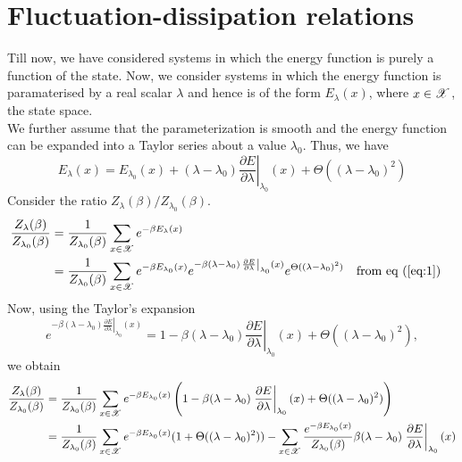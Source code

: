 \documentclass[letterpaper,english,10pt]{article}
\begin{document}
\section{Fluctuation-dissipation relations}
Till now, we have considered systems in which the energy function is purely a function of the state. Now, we consider systems in which the energy function is paramaterised by a real scalar $\lambda$ and hence is of the form $E_\lambda(x)$, where $x \in \mathscr{X}$, the state space.\\
We further assume that the parameterization is smooth and the energy function can be expanded into a Taylor series about a value $\lambda_0$. Thus, we have
\begin{equation}
E_\lambda(x) = E_{\lambda_0}(x) + (\lambda - \lambda_0)\left. \frac{\partial E}{\partial \lambda} \right|_{\lambda_0}(x) + \Theta((\lambda - \lambda_0)^2) \label{eq:1}
\end{equation}
Consider the ratio $Z_\lambda(\beta) / Z_{\lambda_0}(\beta)$.
\begin{align}
\frac{Z_\lambda(\beta)}{Z_{\lambda_0}(\beta)} &= \frac{1}{Z_{\lambda_0}(\beta)} \sum_{x \in \mathscr{X}} e^{-\beta E_{\lambda}(x)} \nonumber \\
	&= \frac{1}{Z_{\lambda_0}(\beta)} \sum_{x \in \mathscr{X}} e^{-\beta E_{\lambda_0}(x)} e^{-\beta (\lambda - \lambda_0)\left. \frac{\partial E}{\partial \lambda} \right|_{\lambda_0}(x)} e^{\Theta((\lambda - \lambda_0)^2)} && \text{from eq (\ref{eq:1})} \nonumber
\end{align}
Now, using the Taylor's expansion
\begin{equation}
e^{-\beta (\lambda - \lambda_0)\left. \frac{\partial E}{\partial \lambda} \right|_{\lambda_0}(x)} = 1 - \beta (\lambda - \lambda_0) \left. \frac{\partial E}{\partial \lambda} \right|_{\lambda_0}(x) + \Theta((\lambda - \lambda_0)^2), \label{eq:5}
\end{equation}
we obtain
\begin{align}
\frac{Z_\lambda(\beta)}{Z_{\lambda_0}(\beta)} &= \frac{1}{Z_{\lambda_0}(\beta)} \sum_{x \in \mathscr{X}} e^{-\beta E_{\lambda_0}(x)} \left( 1 - \beta (\lambda - \lambda_0) \left. \frac{\partial E}{\partial \lambda} \right|_{\lambda_0}(x) + \Theta((\lambda - \lambda_0)^2) \right) \nonumber \\
	&= \frac{1}{Z_{\lambda_0}(\beta)} \sum_{x \in \mathscr{X}} e^{-\beta E_{\lambda_0}(x)}(1 + \Theta((\lambda - \lambda_0)^2)) - \sum_{x \in \mathscr{X}} \frac{e^{- \beta E_{\lambda_0}(x)}}{Z_{\lambda_0}(\beta)} \beta (\lambda - \lambda_0) \left. \frac{\partial E}{\partial \lambda} \right|_{\lambda_0}(x) \label{eq:2}
\end{align}
\end{document}
